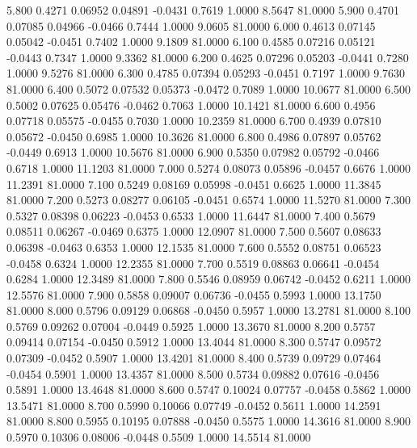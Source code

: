    5.800   0.4271   0.06952   0.04891  -0.0431   0.7619   1.0000   8.5647  81.0000
   5.900   0.4701   0.07085   0.04966  -0.0466   0.7444   1.0000   9.0605  81.0000
   6.000   0.4613   0.07145   0.05042  -0.0451   0.7402   1.0000   9.1809  81.0000
   6.100   0.4585   0.07216   0.05121  -0.0443   0.7347   1.0000   9.3362  81.0000
   6.200   0.4625   0.07296   0.05203  -0.0441   0.7280   1.0000   9.5276  81.0000
   6.300   0.4785   0.07394   0.05293  -0.0451   0.7197   1.0000   9.7630  81.0000
   6.400   0.5072   0.07532   0.05373  -0.0472   0.7089   1.0000  10.0677  81.0000
   6.500   0.5002   0.07625   0.05476  -0.0462   0.7063   1.0000  10.1421  81.0000
   6.600   0.4956   0.07718   0.05575  -0.0455   0.7030   1.0000  10.2359  81.0000
   6.700   0.4939   0.07810   0.05672  -0.0450   0.6985   1.0000  10.3626  81.0000
   6.800   0.4986   0.07897   0.05762  -0.0449   0.6913   1.0000  10.5676  81.0000
   6.900   0.5350   0.07982   0.05792  -0.0466   0.6718   1.0000  11.1203  81.0000
   7.000   0.5274   0.08073   0.05896  -0.0457   0.6676   1.0000  11.2391  81.0000
   7.100   0.5249   0.08169   0.05998  -0.0451   0.6625   1.0000  11.3845  81.0000
   7.200   0.5273   0.08277   0.06105  -0.0451   0.6574   1.0000  11.5270  81.0000
   7.300   0.5327   0.08398   0.06223  -0.0453   0.6533   1.0000  11.6447  81.0000
   7.400   0.5679   0.08511   0.06267  -0.0469   0.6375   1.0000  12.0907  81.0000
   7.500   0.5607   0.08633   0.06398  -0.0463   0.6353   1.0000  12.1535  81.0000
   7.600   0.5552   0.08751   0.06523  -0.0458   0.6324   1.0000  12.2355  81.0000
   7.700   0.5519   0.08863   0.06641  -0.0454   0.6284   1.0000  12.3489  81.0000
   7.800   0.5546   0.08959   0.06742  -0.0452   0.6211   1.0000  12.5576  81.0000
   7.900   0.5858   0.09007   0.06736  -0.0455   0.5993   1.0000  13.1750  81.0000
   8.000   0.5796   0.09129   0.06868  -0.0450   0.5957   1.0000  13.2781  81.0000
   8.100   0.5769   0.09262   0.07004  -0.0449   0.5925   1.0000  13.3670  81.0000
   8.200   0.5757   0.09414   0.07154  -0.0450   0.5912   1.0000  13.4044  81.0000
   8.300   0.5747   0.09572   0.07309  -0.0452   0.5907   1.0000  13.4201  81.0000
   8.400   0.5739   0.09729   0.07464  -0.0454   0.5901   1.0000  13.4357  81.0000
   8.500   0.5734   0.09882   0.07616  -0.0456   0.5891   1.0000  13.4648  81.0000
   8.600   0.5747   0.10024   0.07757  -0.0458   0.5862   1.0000  13.5471  81.0000
   8.700   0.5990   0.10066   0.07749  -0.0452   0.5611   1.0000  14.2591  81.0000
   8.800   0.5955   0.10195   0.07888  -0.0450   0.5575   1.0000  14.3616  81.0000
   8.900   0.5970   0.10306   0.08006  -0.0448   0.5509   1.0000  14.5514  81.0000
